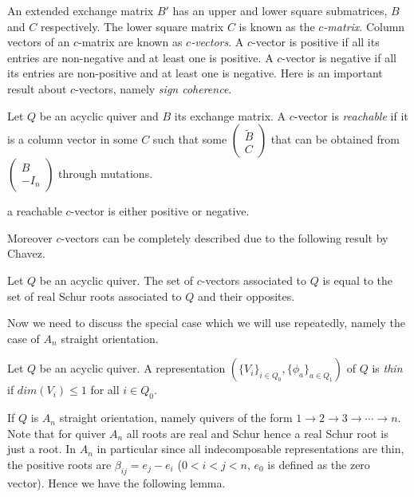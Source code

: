 \indent An extended exchange matrix $B'$ has an upper and lower square submatrices, $B$ and $C$ respectively. The lower square matrix $C$ is known as the $c$\textit{-matrix}. Column vectors of an $c$-matrix are known as $c$\textit{-vectors}. A $c$-vector is positive if all its entries are non-negative and at least one is positive. A $c$-vector is negative if all its entries are non-positive and at least one is negative. Here is an important result about $c$-vectors, namely \textit{sign coherence}.\\
\begin{definition}
Let $Q$ be an acyclic quiver and $B$ its exchange matrix. A $c$-vector is \textit{reachable} if it is a column vector in some $C$ such that some $\begin{pmatrix}\tilde{B}\\C\end{pmatrix}$ that can be obtained from $\begin{pmatrix}B\\-I_n\end{pmatrix}$ through mutations.
\end{definition}
\begin{theorem}
\cite{GHKK14}\cite{DWZ08}\cite{DWZ10} a reachable $c$-vector is either positive or negative.
\end{theorem}
\indent Moreover $c$-vectors can be completely described due to the following result by Chavez\cite{C15}.\\
\begin{theorem} \label{CV}
Let $Q$ be an acyclic quiver. The set of $c$-vectors associated to $Q$ is equal to the set of real Schur roots associated to $Q$ and their opposites.
\end{theorem}
\indent Now we need to discuss the special case which we will use repeatedly, namely the case of $A_n$ straight orientation.\\
\begin{definition}
Let $Q$ be an acyclic quiver. A representation $(\{V_i\}_{i\in Q_0}, \{\phi_a\}_{a\in Q_1})$ of $Q$ is \textit{thin} if $dim(V_i) \leq 1$ for all $i\in Q_0$.
\end{definition}
\indent If $Q$ is $A_n$ straight orientation, namely quivers of the form $1\to 2\to 3\to\cdots\to n$. Note that for quiver $A_n$ all roots are real and Schur hence a real Schur root is just a root. In $A_n$ in particular since all indecomposable representations are thin, the positive roots are $\beta_{ij}=e_j-e_i$ ($0<i<j<n$, $e_0$ is defined as the zero vector). Hence we have the following lemma.\\

